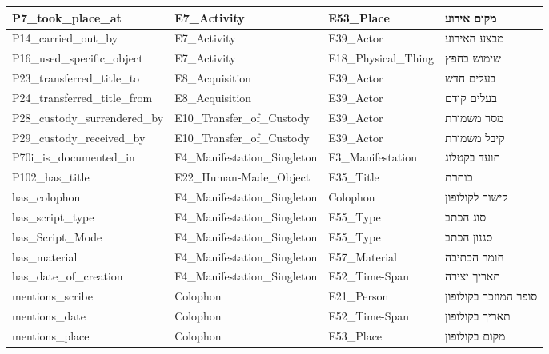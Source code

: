 {\begin{longtable}{|p{4cm}|p{3.5cm}|p{3.5cm}|p{4.5cm}|}
\hline
\textenglish{P7\_took\_place\_at} & \textenglish{E7\_Activity} & \textenglish{E53\_Place} & מקום אירוע \\
\hline
\textenglish{P14\_carried\_out\_by} & \textenglish{E7\_Activity} & \textenglish{E39\_Actor} & מבצע האירוע \\
\hline
\textenglish{P16\_used\_specific\_object} & \textenglish{E7\_Activity} & \textenglish{E18\_Physical\_Thing} & שימוש בחפץ \\
\hline
\textenglish{P23\_transferred\_title\_to} & \textenglish{E8\_Acquisition} & \textenglish{E39\_Actor} & בעלים חדש \\
\hline
\textenglish{P24\_transferred\_title\_from} & \textenglish{E8\_Acquisition} & \textenglish{E39\_Actor} & בעלים קודם \\
\hline
\textenglish{P28\_custody\_surrendered\_by} & \textenglish{E10\_Transfer\_of\_Custody} & \textenglish{E39\_Actor} & מסר משמורת \\
\hline
\textenglish{P29\_custody\_received\_by} & \textenglish{E10\_Transfer\_of\_Custody} & \textenglish{E39\_Actor} & קיבל משמורת \\
\hline
\textenglish{P70i\_is\_documented\_in} & \textenglish{F4\_Manifestation\_Singleton} & \textenglish{F3\_Manifestation} & תועד בקטלוג \\
\hline
\textenglish{P102\_has\_title} & \textenglish{E22\_Human-Made\_Object} & \textenglish{E35\_Title} & כותרת \\
\hline
\textenglish{has\_colophon} & \textenglish{F4\_Manifestation\_Singleton} & \textenglish{Colophon} & קישור לקולופון \\
\hline
\textenglish{has\_script\_type} & \textenglish{F4\_Manifestation\_Singleton} & \textenglish{E55\_Type} & סוג הכתב \\
\hline
\textenglish{has\_Script\_Mode} & \textenglish{F4\_Manifestation\_Singleton} & \textenglish{E55\_Type} & סגנון הכתב \\
\hline
\textenglish{has\_material} & \textenglish{F4\_Manifestation\_Singleton} & \textenglish{E57\_Material} & חומר הכתיבה \\
\hline
\textenglish{has\_date\_of\_creation} & \textenglish{F4\_Manifestation\_Singleton} & \textenglish{E52\_Time-Span} & תאריך יצירה \\
\hline
\textenglish{mentions\_scribe} & \textenglish{Colophon} & \textenglish{E21\_Person} & סופר המוזכר בקולופון \\
\hline
\textenglish{mentions\_date} & \textenglish{Colophon} & \textenglish{E52\_Time-Span} & תאריך בקולופון \\
\hline
\textenglish{mentions\_place} & \textenglish{Colophon} & \textenglish{E53\_Place} & מקום בקולופון \\
\hline
\end{longtable}
}

